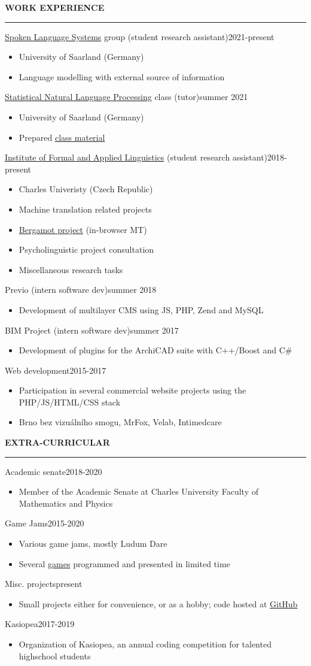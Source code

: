 \documentclass[11pt,a4paper]{article} %
\newcommand{\hSection}[1]{
    \medskip
    \MakeUppercase{\bf #1}
    \medskip
    \hrule
}
\newcommand{\hSubsectionItemize}[3]{
    {#1}\hfill {#2}\hspace{-1cm}\\
    \vspace{-0.5cm}
    \begin{itemize} \footnotesize #3 \end{itemize}
    \vspace{0.3\baselineskip}
}
\begin{document}
\hSection{Work Experience}
\hSubsectionItemize
{\href{https://www.lsv.uni-saarland.de/}{Spoken Language Systems} group (student research assistant)}
{2021-present}
{
    \item University of Saarland (Germany)
    \item Language modelling with external source of information
}

\hSubsectionItemize
{\href{https://teaching.lsv.uni-saarland.de/snlp/}{Statistical Natural Language Processing} class (tutor)}
{summer 2021}
{
    \item University of Saarland (Germany)
    \item Prepared \href{https://github.com/zouharvi/uds-snlp-tutorial}{class material}
}

\hSubsectionItemize
{\href{https://ufal.mff.cuni.cz}{Institute of Formal and Applied Linguistics} (student research assistant)}
{2018-present}
{
    \item Charles Univeristy (Czech Republic)
    \item Machine translation related projects
    \item \href{https://browser.mt/}{Bergamot project} (in-browser MT)
    \item Psycholinguistic project consultation
    \item Miscellaneous research tasks
}

\hSubsectionItemize
{Previo (intern software dev)}
{summer 2018}
{
    \item Development of multilayer CMS using JS, PHP, Zend and MySQL
}

\hSubsectionItemize
{BIM Project (intern software dev)}
{summer 2017}
{
    \item Development of plugins for the ArchiCAD suite with C++/Boost and C\#
}

\hSubsectionItemize
{Web development}
{2015-2017}
{
\item Participation in several commercial website projects using the PHP/JS/HTML/CSS stack
\item Brno bez vizuálního smogu, MrFox, Velab, Intimedcare 
}

\hSection{Extra-Curricular}
\hSubsectionItemize
{Academic senate}
{2018-2020}
{
\item Member of the Academic Senate at Charles University Faculty of Mathematics and Physics
}

\hSubsectionItemize
{Game Jams}
{2015-2020}
{
\item Various game jams, mostly Ludum Dare
\item Several \href{https://github.com/allemansratten}{games} programmed and presented in limited time
}

\hSubsectionItemize
{Misc. projects}
{present}
{
\item Small projects either for convenience, or as a hobby; code hosted at \href{https://github.com/zouharvi}{GitHub}
}

\hSubsectionItemize
{Kasiopea}
{2017-2019}
{
\item Organization of Kasiopea, an annual coding competition for talented highschool students
}
\end{document}
